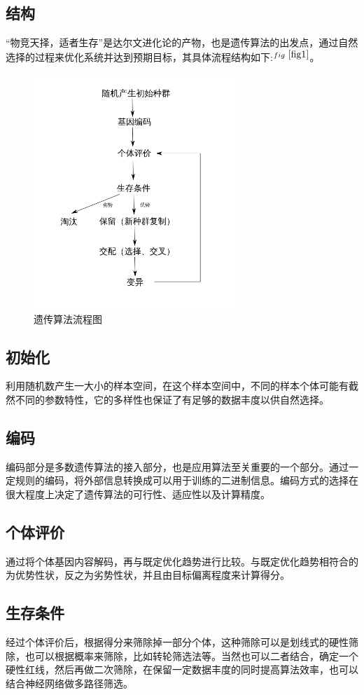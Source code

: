 \documentclass[14pt, a4paper]{article}
\begin{document}
    \subsection{结构}
        “物竞天择，适者生存”是达尔文进化论的产物，也是遗传算法的出发点，通过自然选择的过程来优化系统并达到预期目标，其具体流程结构如下:$^{fig\ \ref{fig1}}$。
    \begin{figure}[htbp]
        \centering
        \includegraphics[width = 3in]{fig/遗传算法.png}
        \caption{遗传算法流程图}
        \label{fig1}
    \end{figure}
    \subsection{初始化}
        利用随机数产生一大小的样本空间，在这个样本空间中，不同的样本个体可能有截然不同的参数特性，它的多样性也保证了有足够的数据丰度以供自然选择。
    \subsection{编码}
        编码部分是多数遗传算法的接入部分，也是应用算法至关重要的一个部分。通过一定规则的编码，将外部信息转换成可以用于训练的二进制信息。编码方式的选择在很大程度上决定了遗传算法的可行性、适应性以及计算精度。
    \subsection{个体评价}
        通过将个体基因内容解码，再与既定优化趋势进行比较。与既定优化趋势相符合的为优势性状，反之为劣势性状，并且由目标偏离程度来计算得分。
    \subsection{生存条件}
        经过个体评价后，根据得分来筛除掉一部分个体，这种筛除可以是划线式的硬性筛除，也可以根据概率来筛除，比如转轮筛选法等。当然也可以二者结合，确定一个硬性红线，然后再做二次筛除，在保留一定数据丰度的同时提高算法效率，也可以结合神经网络做多路径筛选。
\end{document}
